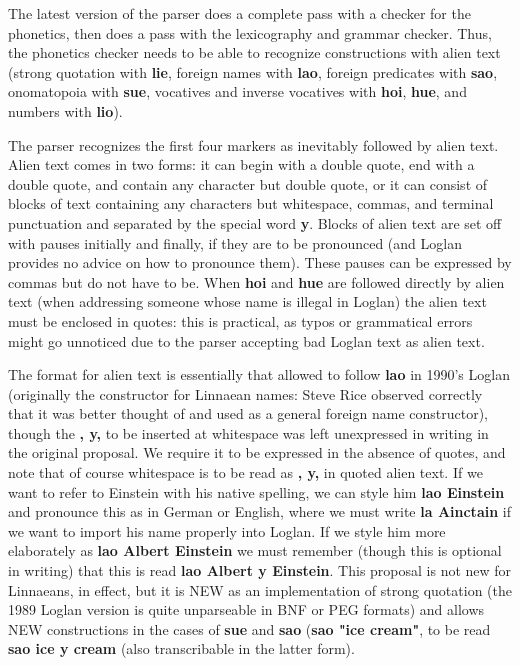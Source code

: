 \documentclass[12pt]{book}
\begin{document}
The latest version of the parser does a complete pass with a checker for the phonetics, then does a pass with the lexicography and grammar checker.
Thus, the phonetics checker needs to be able to recognize constructions with alien text (strong quotation with {\bf lie}, foreign names with {\bf lao}, foreign predicates with {\bf sao}, onomatopoia with {\bf sue}, vocatives and inverse vocatives with {\bf hoi}, {\bf hue}, and numbers with {\bf lio}).

The parser recognizes the first four markers as inevitably followed by alien text.  Alien text comes in two forms:  it can begin with a double quote,
end with a double quote, and contain any character but double quote, or it can consist of blocks of text containing any characters but whitespace, commas, and terminal punctuation and separated by the special word {\bf y}.  Blocks of alien text are set off with pauses initially and finally, if they are to be pronounced (and Loglan provides no advice on how to pronounce them).  These pauses can be expressed by commas but do not have to be.  When {\bf hoi} and
{\bf hue} are followed directly by alien text (when addressing someone whose name is illegal in Loglan) the alien text must be enclosed in quotes:  this is practical, as typos or grammatical errors might go unnoticed due to the parser accepting bad Loglan text as alien text.

The format for alien text is essentially that allowed to follow {\bf lao} in 1990's Loglan (originally the constructor for Linnaean names:  Steve Rice observed correctly that it was better thought of and used as a general foreign name constructor), though the {\bf, y,} to be inserted at whitespace was left unexpressed in writing in the original proposal.   We require it to be expressed in the absence of quotes, and note that of course whitespace is to be read as {\bf, y,} in quoted alien text. If we want to refer to Einstein with his native spelling, we can style him {\bf lao Einstein} and pronounce this as in German or English, where we must write {\bf la Ainctain} if we want to import his name properly into Loglan.  If we style him more elaborately as {\bf lao Albert Einstein} we must remember (though this is optional in writing) that this is read {\bf lao Albert y Einstein}.
This proposal is not new for Linnaeans, in effect, but it is NEW as an implementation of strong quotation (the 1989 Loglan version is quite unparseable in BNF or PEG formats) and allows NEW constructions in the cases of {\bf sue} and {\bf sao} ({\bf sao "ice cream"}, to be read {\bf sao ice y cream} (also transcribable in the latter form).
\end{document}
